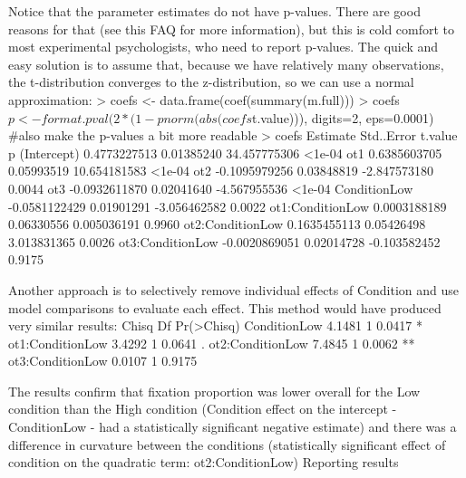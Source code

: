 Notice that the parameter estimates do not have p-values. There are good reasons for that (see this FAQ for more information), but this is cold comfort to most experimental psychologists, who need to report p-values. The quick and easy solution is to assume that, because we have relatively many observations, the t-distribution converges to the z-distribution, so we can use a normal approximation:
> coefs <- data.frame(coef(summary(m.full))) 
> coefs$p <- format.pval(2*(1-pnorm(abs(coefs$t.value))), digits=2, eps=0.0001) #also make the p-values a bit more readable
> coefs
                      Estimate Std..Error      t.value      p
(Intercept)       0.4773227513 0.01385240 34.457775306 <1e-04
ot1               0.6385603705 0.05993519 10.654181583 <1e-04
ot2              -0.1095979256 0.03848819 -2.847573180 0.0044
ot3              -0.0932611870 0.02041640 -4.567955536 <1e-04
ConditionLow     -0.0581122429 0.01901291 -3.056462582 0.0022
ot1:ConditionLow  0.0003188189 0.06330556  0.005036191 0.9960
ot2:ConditionLow  0.1635455113 0.05426498  3.013831365 0.0026
ot3:ConditionLow -0.0020869051 0.02014728 -0.103582452 0.9175

Another approach is to selectively remove individual effects of Condition and use model comparisons to evaluate each effect. This method would have produced very similar results:
                                  Chisq Df Pr(>Chisq) 
ConditionLow         4.1481 1 0.0417  *
ot1:ConditionLow 3.4292 1 0.0641 . 
ot2:ConditionLow 7.4845 1 0.0062  **
ot3:ConditionLow 0.0107 1 0.9175 

The results confirm that fixation proportion was lower overall for the Low condition than the High condition (Condition effect on the intercept - ConditionLow - had a statistically significant negative estimate) and there was a difference in curvature between the conditions (statistically significant effect of condition on the quadratic term: ot2:ConditionLow)
Reporting results

